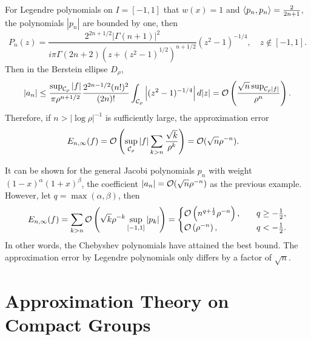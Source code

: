 \begin{example}
    For Legendre polynomials on $I = [-1, 1]$ that $w(x) = 1$ and $\langle {p_n, p_n} \rangle = \frac{2}{2n+1}$, the polynomials $|p_n|$ are bounded by one, then 
    \begin{equation}
        P_n(z) = \frac{2^{2n+1/2}|\Gamma(n+1)|^2}{i\pi \Gamma(2n+2)(z+(z^2-1)^{1/2})^{n+1/2}} (z^2-1)^{-1/4},\quad z\notin [-1,1].
    \end{equation}
    Then in the Berstein ellipse $D_{\rho}$, 
    \begin{equation}
        |a_n|\le \frac{\sup_{\mathcal C_{\rho}}|f|}{\pi \rho^{n + 1/2} } \frac{2^{2n-1/2}(n!)^2 }{ (2n)!  }\int_{\mathcal C_{\rho}} \left|(z^2 - 1)^{-1/4}\right| d|z| = \mathcal O\left(\frac{\sqrt{ n}\sup_{\mathcal C_{\rho}|f|}}{\rho^n}\right).
    \end{equation}
    Therefore, if $n > |\log \rho|^{-1}$ is sufficiently large, the approximation error
    \begin{equation}
    \begin{aligned}
        E_{n,\infty}(f) &= \mathcal O\left(\sup_{\mathcal C_{\rho} } |f| \sum_{k>n}\frac{\sqrt{k}}{\rho^k}\right) = \mathcal O(\sqrt{n}\rho^{-n}).
    \end{aligned}
    \end{equation}
\end{example}
\begin{remark}
    It can be shown for the general Jacobi polynomials $p_n$ with weight $(1-x)^{\alpha}(1+x)^{\beta}$, the coefficient 
    $|a_n| = \mathcal O(\sqrt{n} \rho^{-n} )$ as the previous example. However, let $q = \max(\alpha, \beta)$, then 
    \begin{equation}
        E_{n,\infty}(f) = \sum_{k>n} \mathcal O\left(\sqrt{k} \rho^{-k} \sup_{[-1,1]} |p_k|\right) = \begin{cases}
            \mathcal O\left( n^{q+\frac{1}{2}}\rho^{-n}\right),\quad & q\ge -\frac{1}{2},        \\
             \mathcal O\left( \rho^{-n} \right),\quad & q < -\frac{1}{2}. 
            \end{cases}
    \end{equation}
    In other words, the Chebyshev polynomials have attained the best bound. The approximation error by Legendre polynomials only differs by a factor of $\sqrt{n}$. 
\end{remark}
\section{Approximation Theory on Compact Groups}
\subsection{}

